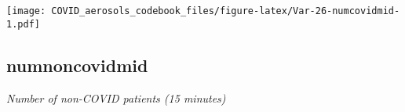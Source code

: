 \documentclass[]{article}
\begin{document}
\begin{minipage}{0.25 \textwidth}

\texttt{[image: COVID\_aerosols\_codebook\_files/figure-latex/Var-26-numcovidmid-1.pdf]}

\end{minipage}

\noindent\makebox[\linewidth]{\rule{\textwidth}{0.4pt}}

\hypertarget{numnoncovidmid}{%
\subsection{numnoncovidmid}\label{numnoncovidmid}}

\emph{Number of non-COVID patients (15 minutes)}

\begin{minipage}{0.75 \textwidth}


\end{minipage}
\end{document}
